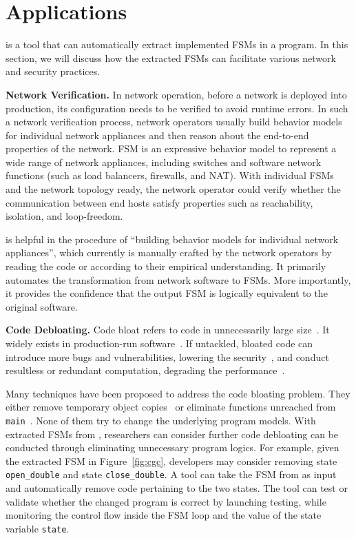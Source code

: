 
\section{Applications}
\Tool{} is a tool that can automatically extract implemented FSMs in a program. 
In this section, we will discuss how the extracted FSMs can facilitate 
various network and security practices.  


\noindent\textbf{Network Verification.}  In network operation, before a network 
is deployed into production, its configuration needs to be verified to avoid 
runtime errors. In such a network verification process, network operators 
usually build behavior models for individual network appliances and then 
reason about the end-to-end properties of the 
network\cite{mai2011debugging,khurshid2013veriflow,kazemian2012header,kazemian2013real,fayaz2016buzz,panda2017verifying}. 
FSM is an expressive 
behavior model to represent a wide range of network appliances, including 
switches and software network functions (such as load balancers, firewalls, 
and NAT). With individual FSMs and the network topology ready, the network 
operator could verify whether the communication between end hosts satisfy 
properties such as reachability, isolation, and loop-freedom.\cite{}

\Tool{} is helpful in the procedure of ``building behavior models for 
individual network appliances'', which currently is manually crafted by 
the network operators by reading the code or according to their 
empirical understanding. It primarily automates the 
transformation from network software to FSMs. More importantly, it 
provides the confidence that the output FSM is logically equivalent 
to the original software.

\noindent\textbf{Code Debloating.}
Code bloat refers to code in unnecessarily large size~\cite{code-bloat}.
It widely exists in production-run software~\cite{code-bloat-study}. 
If untackled, bloated code can introduce more bugs and vulnerabilities, 
lowering the security~\cite{protocol-mao}, 
and conduct resultless or redundant computation, 
degrading the performance~\cite{BloatFSE2008,XuBloatPLDI2009,XuBloatPLDI2010}. 

Many techniques have been proposed to address the code bloating problem. 
They either remove temporary object copies~\cite{BloatFSE2008,XuBloatPLDI2009,
XuBloatPLDI2010,Reusable,Cachetor} 
or eliminate functions unreached from 
\texttt{main}~\cite{container-debloating-1, 
container-debloating-2, dinghao-1}. 
None of them try to change the underlying program models.
With extracted FSMs from \Tool{}, researchers can consider 
further code debloating can be conducted through
eliminating unnecessary program logics. 
For example, given the extracted FSM in Figure~\ref{fig:cgc}, 
developers may consider removing state \texttt{open\_double} and 
state \texttt{close\_double}. 
A tool can take the FSM from \Tool{} as input and automatically 
remove code pertaining to the two states. 
The tool can test or validate whether the changed program is correct 
by launching testing, while monitoring the control flow 
inside the FSM loop and the value of the state variable \texttt{state}.



